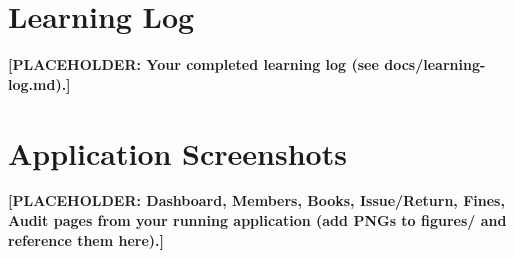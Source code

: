 \documentclass[12pt,a4paper]{article}
\newcommand{\placeholder}[1]{\textbf{[PLACEHOLDER: #1]}}
\begin{document}
\section{Learning Log}
\label{app:log}
\placeholder{Your completed learning log (see docs/learning-log.md).}

\section{Application Screenshots}
\label{app:screens}
\placeholder{Dashboard, Members, Books, Issue/Return, Fines, Audit pages
from your running application (add PNGs to figures/ and reference them
here).}
\end{document}
